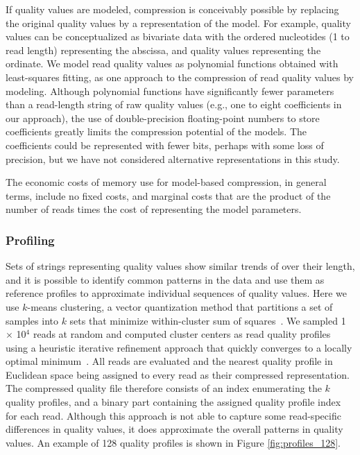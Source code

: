 \documentclass{bioinfo}
\begin{document}
\begin{methods}
If quality values are modeled, compression is conceivably possible by
replacing the original quality values by a representation of the
model. For example, quality values can be conceptualized as bivariate
data with the ordered nucleotides (1 to read length) representing the
abscissa, and quality values representing the ordinate. We model read
quality values as polynomial functions obtained with least-squares
fitting, as one approach to the compression of read quality values by
modeling. Although polynomial functions have significantly fewer
parameters than a read-length string of raw quality values (e.g., one
to eight coefficients in our approach), the use of double-precision
floating-point numbers to store coefficients greatly limits the
compression potential of the models. The coefficients could be
represented with fewer bits, perhaps with some loss of precision, but
we have not considered alternative representations in this study.

The economic costs of memory use for model-based compression, in
general terms, include no fixed costs, and marginal costs that are the
product of the number of reads times the cost of representing the
model parameters.

\subsubsection{Profiling}

Sets of strings representing quality values show similar trends of
over their length, and it is possible to identify common patterns in
the data and use them as reference profiles to approximate individual
sequences of quality values. Here we use $k$-means clustering, a
vector quantization method that partitions a set of samples into $k$
sets that minimize within-cluster sum of
squares~\citep{macqueen1967some}. We sampled 1 $\times$ 10$^{4}$ reads
at random and computed cluster centers as read quality profiles using
a heuristic iterative refinement approach that quickly converges to a
locally optimal minimum~\citep{hartigan1979algorithm}. All reads are
evaluated and the nearest quality profile in Euclidean space being
assigned to every read as their compressed representation.  The
compressed quality file therefore consists of an index enumerating the
$k$ quality profiles, and a binary part containing the assigned
quality profile index for each read.  Although this approach is not
able to capture some read-specific differences in quality values, it
does approximate the overall patterns in quality values. An example of
128 quality profiles is shown in Figure \ref{fig:profiles_128}.


\end{methods}
\end{document}
